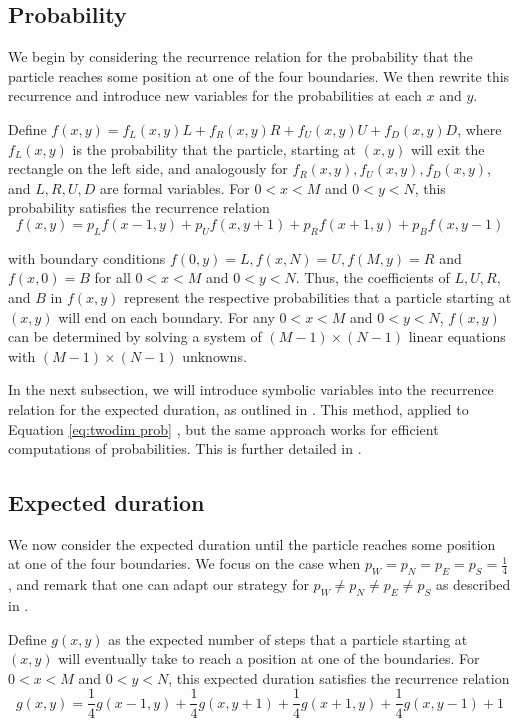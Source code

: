 \documentclass[reqno]{amsart}
\theoremstyle{definition}
\theoremstyle{definition}
\theoremstyle{remark}
\begin{document}
\subsection{Probability}
We begin by considering the recurrence relation for the probability that the particle reaches some position at one of the four boundaries. We then rewrite this recurrence and introduce new variables for the probabilities at each $x$ and $y$.

Define $f(x,y)=f_L(x,y)L+f_R(x,y)R+f_U(x,y)U+f_D(x,y)D$, where $f_L(x,y)$ is the probability that the particle, starting at $(x,y)$ will exit the rectangle on the left side,
and analogously for $f_R(x,y),f_U(x,y),f_D(x,y)$, and $L,R,U,D$ are formal variables.
For $0<x<M$ and $0<y<N$, this probability satisfies the recurrence relation
\begin{equation}\label{eq:twodim prob}
    f(x,y)=p_Lf(x-1,y)+p_Uf(x,y+1)+p_Rf(x+1,y)+p_Bf(x,y-1)
\end{equation}

with boundary conditions $f(0,y)=L, f(x,N)=U, f(M,y)=R$ and $f(x,0)=B$ for all $0<x<M$ and $0<y<N$. 
Thus, the coefficients of $L, U, R,$ and $B$ in $f(x,y)$ represent the respective probabilities that a particle starting at $(x,y)$ will end on each boundary. For any $0<x<M$ and $0<y<N$, $f(x,y)$ can be determined by solving a system of $(M-1)\times(N-1)$ linear equations with $(M-1)\times(N-1)$ unknowns.

In the next subsection, we will introduce symbolic variables into the recurrence relation for the expected duration, as outlined in . This method, applied to Equation \ref{eq:twodim prob} , 
but the same approach works for efficient computations of probabilities.
This is further detailed in .

\subsection{Expected duration}\label{subsec:exp in 2d} We now consider the expected duration until the particle reaches some position at one of the four boundaries. We focus on the case when $p_W=p_N=p_E=p_S=\frac{1}{4}$, and remark that one can adapt our strategy for $p_W\neq p_N\neq p_E\neq p_S$ as described in . 


Define $g(x,y)$ as the expected number of steps that a particle starting at $(x,y)$ will eventually take to reach a position at one of the boundaries. For $0<x<M$ and $0<y<N$, this expected duration satisfies the recurrence relation
\begin{equation}\label{eq:2d expected duration}
    g(x,y)=\frac{1}{4}g(x-1,y)+\frac{1}{4}g(x,y+1)+\frac{1}{4}g(x+1,y)+\frac{1}{4}g(x,y-1)+1
\end{equation}
\end{document}
